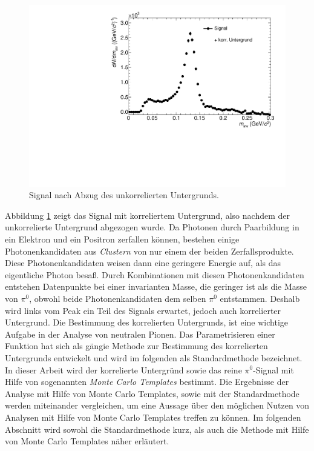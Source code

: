 \begin{figure}[tbp]
\centering
\includegraphics[width=.75\linewidth]{hInvMass_Data.pdf}
\caption{Signal nach Abzug des unkorrelierten Untergrunds.}
\label{figInvMass_Data}
\end{figure}
\newline
Abbildung \ref{figInvMass_Data} zeigt das Signal mit korreliertem Untergrund, also nachdem der unkorrelierte Untergrund abgezogen wurde.
Da Photonen durch Paarbildung in ein Elektron und ein Positron zerfallen k\"onnen, bestehen einige Photonenkandidaten aus \textit{Clustern} von nur einem der beiden Zerfallsprodukte.
Diese Photonenkandidaten weisen dann eine geringere Energie auf, als das eigentliche Photon besa{\ss}.
Durch Kombinationen mit diesen Photonenkandidaten entstehen Datenpunkte bei einer invarianten Masse, die geringer ist als die Masse von $\pi^{0}$, obwohl beide Photonenkandidaten dem selben $\pi^{0}$ entstammen.
Deshalb wird links vom Peak ein Teil des Signals erwartet, jedoch auch korrelierter Untergrund.
\newline
Die Bestimmung des korrelierten Untergrunds, ist eine wichtige Aufgabe in der Analyse von neutralen Pionen.
Das Parametrisieren einer Funktion hat sich als g\"angie Methode zur Bestimmung des korrelierten Untergrunds entwickelt und wird im folgenden als Standardmethode bezeichnet.
In dieser Arbeit wird der korrelierte Untergr\"und sowie das reine $\pi^{0}$-Signal mit Hilfe von sogenannten \textit{Monte Carlo Templates} bestimmt.
Die Ergebnisse der Analyse mit Hilfe von Monte Carlo Templates, sowie mit der Standardmethode werden miteinander vergleichen, um eine Aussage \"uber den m\"oglichen Nutzen von Analysen mit Hilfe von Monte Carlo Templates treffen zu k\"onnen.
Im folgenden Abschnitt wird sowohl die Standardmethode kurz, als auch die Methode mit Hilfe von Monte Carlo Templates n\"aher erl\"autert.